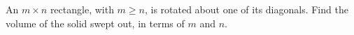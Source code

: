 An $m\times n$ rectangle, with $m\ge n$, is rotated about one of its diagonals. Find the volume of the solid swept out, in terms of $m$ and $n$.
